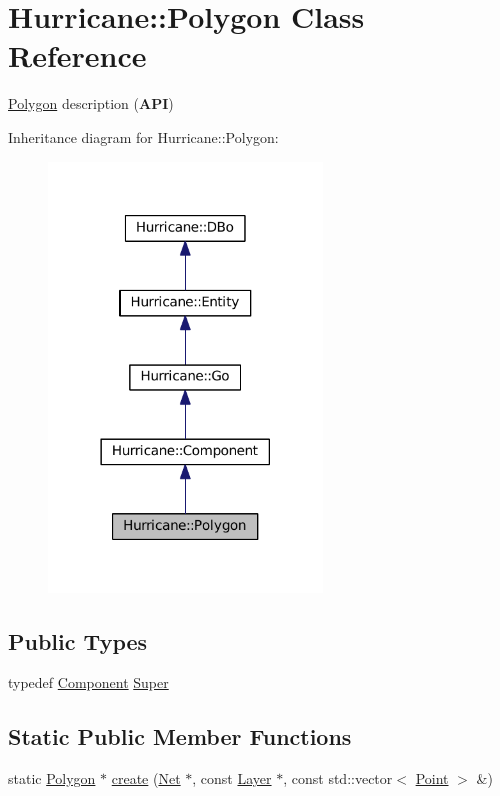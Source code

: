 \hypertarget{classHurricane_1_1Polygon}{}\section{Hurricane\+:\+:Polygon Class Reference}
\label{classHurricane_1_1Polygon}


\mbox{\hyperlink{classHurricane_1_1Polygon}{Polygon}} description ({\bfseries A\+PI})  




Inheritance diagram for Hurricane\+:\+:Polygon\+:\nopagebreak
\begin{figure}[H]
\begin{center}
\leavevmode
\includegraphics[width=206pt]{classHurricane_1_1Polygon__inherit__graph}
\end{center}
\end{figure}
\subsection*{Public Types}
\begin{DoxyCompactItemize}
\item 
typedef \mbox{\hyperlink{classHurricane_1_1Component}{Component}} \mbox{\hyperlink{classHurricane_1_1Polygon_adac4dcd1480b81e7778775540b95f81c}{Super}}
\end{DoxyCompactItemize}
\subsection*{Static Public Member Functions}
\begin{DoxyCompactItemize}
\item 
static \mbox{\hyperlink{classHurricane_1_1Polygon}{Polygon}} $\ast$ \mbox{\hyperlink{classHurricane_1_1Polygon_ac248679558ff51bf509b28050027b7da}{create}} (\mbox{\hyperlink{classHurricane_1_1Net}{Net}} $\ast$, const \mbox{\hyperlink{classHurricane_1_1Layer}{Layer}} $\ast$, const std\+::vector$<$ \mbox{\hyperlink{classHurricane_1_1Point}{Point}} $>$ \&)
\end{DoxyCompactItemize}

